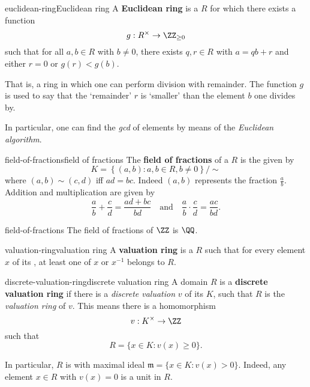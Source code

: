 \begin{topic}{euclidean-ring}{Euclidean ring}
    A \textbf{Euclidean ring} is a  $R$ for which there exists a function
    \[ g : R^\times \to \ZZ_{\ge 0} \]
    such that for all $a, b \in R$ with $b \ne 0$, there exists $q, r \in R$ with $a = qb + r$ and either $r = 0$ or $g(r) < g(b)$.
    
    That is, a ring in which one can perform division with remainder. The function $g$ is used to say that the `remainder' $r$ is `smaller' than the element $b$ one divides by.
    
    In particular, one can find the \textit{gcd} of elements by means of the \textit{Euclidean algorithm}.
\end{topic}

\begin{topic}{field-of-fractions}{field of fractions}
    The \textbf{field of fractions} of a  $R$ is the  given by
    \[ K = \left\{ (a, b) : a, b \in R, b \ne 0 \right\} / \sim{} \]
    where $(a, b) \sim{} (c, d)$ iff $ad = bc$. Indeed $(a, b)$ represents the fraction $\frac{a}{b}$. Addition and multiplication are given by
    \[ \frac{a}{b} + \frac{c}{d} = \frac{ad + bc}{bd} \quad \text{and} \quad \frac{a}{b} \cdot \frac{c}{d} = \frac{ac}{bd} . \]
\end{topic}

\begin{example}{field-of-fractions}
    The field of fractions of $\ZZ$ is $\QQ$.
\end{example}

\begin{topic}{valuation-ring}{valuation ring}
    A \textbf{valuation ring} is a  $R$ such that for every element $x$ of its , at least one of $x$ or $x^{-1}$ belongs to $R$.
\end{topic}

\begin{topic}{discrete-valuation-ring}{discrete valuation ring}
    A domain  $R$ is a \textbf{discrete valuation ring} if there is a \textit{discrete valuation} $v$ of its  $K$, such that $R$ is the \textit{valuation ring} of $v$. This means there is a homomorphism
    \[ v : K^\times \to \ZZ \]
    such that
    \[ R = \{ x \in K : v(x) \ge 0 \} . \]
    
    In particular, $R$ is  with maximal ideal $\mathfrak{m} = \{ x \in K : v(x) > 0 \}$. Indeed, any element $x \in R$ with $v(x) = 0$ is a unit in $R$.
\end{topic}

